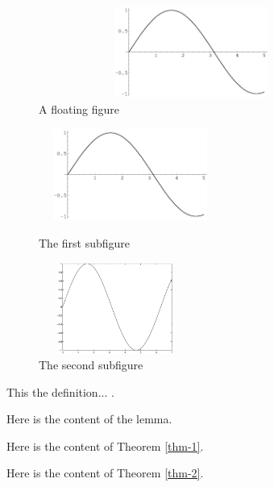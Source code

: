 \documentclass[a4paper,c5size,onecolumn,twoside,nocap,English]{APSart}
\begin{document}
\begin{figure}[htbp]
\centering
\includegraphics[width=10cm,height=3cm]{figs/sin}
\caption{A floating figure\label{fig:fig4}}
\end{figure}

\begin{figure}[htbp]
\begin{minipage}[t]{0.45\linewidth}
\centering
\includegraphics[width=6cm,height=3cm]{figs/sin}
\caption{The first subfigure\label{fig:float2-1}}
\end{minipage}
\hfill
\begin{minipage}[t]{0.5\linewidth}
\centering
\includegraphics[width=5cm,height=3cm]{figs/fig}
\caption{The second subfigure\label{fig:float2-2}}
\end{minipage}
\end{figure}

\begin{definition}
This the definition... .
\end{definition}

\begin{lemma}
Here is the content of the lemma.
\end{lemma}

\begin{theorem}\label{thm-1}
Here is the content of Theorem \ref{thm-1}.
\end{theorem}

\begin{theorem}\label{thm-2}
Here is the content of Theorem \ref{thm-2}.
\end{theorem}
\end{document}
